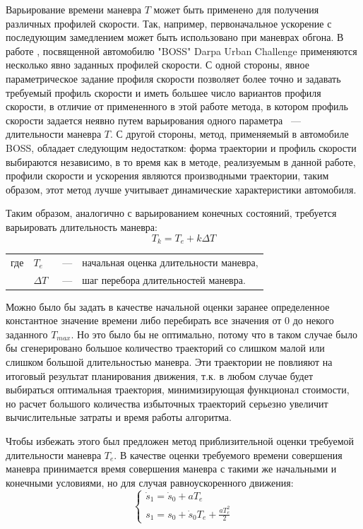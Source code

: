 Варьирование времени маневра $T$ может быть применено для получения различных профилей скорости. Так, например,
первоначальное ускорение с последующим замедлением может быть использовано при маневрах обгона.
В работе \cite{darpa_boss}, посвященной автомобилю "BOSS" Darpa Urban Challenge применяются несколько явно заданных
профилей скорости. С одной стороны, явное параметрическое задание профиля скорости позволяет более точно и задавать
требуемый профиль скорости и иметь большее число вариантов профиля скорости, в отличие от примененного в этой работе
метода, в котором профиль скорости задается неявно путем варьирования одного параметра ~--- длительности маневра $T$.
С другой стороны, метод, применяемый в автомобиле BOSS, обладает следующим недостатком: форма траектории и профиль
скорости выбираются независимо, в то время как в методе, реализуемым  в данной работе, профили скорости и ускорения
являются производными траектории, таким образом, этот метод лучше учитывает динамические характеристики автомобиля.

Таким образом, аналогично с варьированием конечных состояний, требуется варьировать длительность маневра:
\begin{equation}
      T_k = T_e + k\Delta T
\end{equation}
\noindent\begin{tabularx}{\linewidth}{lllX}
      где & $T_e$      &~---& начальная оценка длительности маневра, \\
          & $\Delta T$ &~---& шаг перебора длительностей маневра.
\end{tabularx}

Можно было бы задать в качестве начальной оценки заранее определенное константное значение времени либо перебирать
все значения от 0 до некого заданного $T_{max}$. Но это было бы не оптимально, потому что в таком случае было бы
сгенерировано большое количество траекторий со слишком малой или слишком большой длительностью маневра. Эти траектории
не повлияют на итоговый результат планирования движения, т.к. в любом случае будет выбираться оптимальная траектория,
минимизирующая функционал стоимости, но расчет большого количества избыточных траекторий серьезно увеличит вычислительные
затраты и время работы алгоритма.

Чтобы избежать этого был предложен метод приблизительной оценки требуемой длительности маневра $T_e$. В качестве оценки
требуемого времени совершения маневра принимается время совершения маневра с такими же начальными и конечными
условиями, но для случая равноускоренного движения:
\begin{equation}
      \begin{cases}
            \dot{s}_1 = \dot{s}_0 + aT_e \\
            s_1       = s_0       + \dot{s}_0T_e + \frac{aT_e^2}{2}
      \end{cases}
\end{equation}

